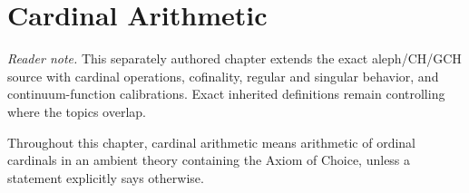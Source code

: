 
\chapter{Cardinal Arithmetic}
\label{sec:p06-cardinal-arithmetic}

\noindent\textit{Reader note.}  This separately authored chapter extends the
exact aleph/CH/GCH source with cardinal operations, cofinality, regular and
singular behavior, and continuum-function calibrations.  Exact inherited
definitions remain controlling where the topics overlap.

Throughout this chapter, cardinal arithmetic means arithmetic of
ordinal cardinals in an ambient theory containing the Axiom of Choice, unless
a statement explicitly says otherwise.

